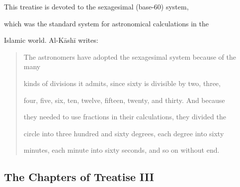 \documentclass[11pt,a4paper]{article}
\newcommand{\ar}[1]{{\arabicfont\beginR #1\endR}}
\begin{document}
\vspace{0.3cm}



\noindent This treatise is devoted to the sexagesimal (base-60) system,

which was the standard system for astronomical calculations in the

Islamic world. Al-K\=ash\=i writes:



\begin{quote}

The astronomers have adopted the sexagesimal system because of the many

kinds of divisions it admits, since sixty is divisible by two, three,

four, five, six, ten, twelve, fifteen, twenty, and thirty. And because

they needed to use fractions in their calculations, they divided the

circle into three hundred and sixty degrees, each degree into sixty

minutes, each minute into sixty seconds, and so on without end.

\end{quote}



\subsection{The Chapters of Treatise III}



\end{document}
